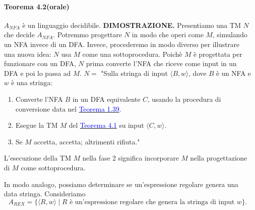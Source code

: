 \documentclass{article}
\begin{document}
\paragraph{Teorema 4.2(orale)}
\label{teorema-4.2}
$A_{NFA}$ è un linguaggio decidibile.
\vspace{1em}
\text{}
\newline
\hbox{\textbf{DIMOSTRAZIONE.}}
Presentiamo una TM $N$ che decide $A_{NFA}$.
Potremmo progettare $N$ in modo che operi come $M$, simulando un NFA invece di un DFA.
Invece, procederemo in modo diverso per illustrare una nuova idea: $N$ usa $M$ come una sottoprocedura.
Poichè $M$ è progettata per funzionare con un DFA, $N$ prima converte l'NFA che riceve come input in un DFA e poi lo passa ad $M$.
\vspace{1em}
\text{}
\newline
$N = $ "Sulla stringa di input $\langle B,w \rangle$, dove $B$ è un NFA e $w$ è una stringa:
\begin{enumerate}
    \item Converte l'NFA $B$ in un DFA equivalente $C$, usando la procedura di conversione data nel \hyperref[teorema-1.39]{\textcolor{blue}{Teorema 1.39}}.
    \item Esegue la TM $M$ del \hyperref[teorema-4.1]{\textcolor{blue}{Teorema 4.1}} su input $\langle C,w \rangle$.
    \item Se $M$ accetta, accetta; altrimenti rifiuta."
\end{enumerate}

L'esecuzione della TM $M$ nella fase 2 significa incorporare $M$ nella progettazione di $M$ come sottoprocedura.
\vspace{1em}

In modo analogo, possiamo determinare se un'espressione regolare genera una data stringa. 
\newline
Consideriamo
$$
A_{REX} = \{\langle R,w \rangle \mid R \text{ è un'espressione regolare che genera la stringa di input } w \}.
$$
\end{document}

